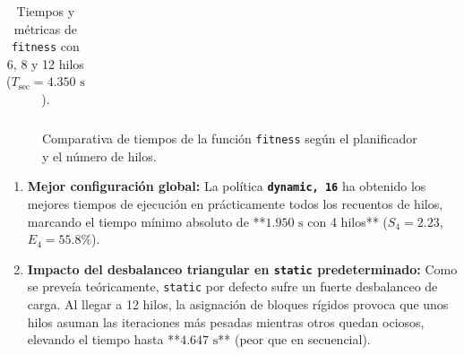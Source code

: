 \documentclass[12pt]{article}
\begin{document}
\begin{enumerate}
\begin{table}[htbp]
\begin{tabular}{llrrr}
    \end{tabular}
    \caption{Tiempos y métricas de \texttt{fitness} con 6, 8 y 12 hilos ($T_{\text{sec}} = 4.350\text{ s}$).}
    \label{tab:scheduling_fitness_b}
\end{table}
\begin{figure}[htbp]
    \centering
    \caption{Comparativa de tiempos de la función \texttt{fitness} según el planificador y el número de hilos.}
    \label{fig:tiempos_fitness}
\end{figure}

\begin{enumerate}
    \item \textbf{Mejor configuración global:} 
    La política \textbf{\texttt{dynamic, 16}} ha obtenido los mejores tiempos de ejecución en prácticamente todos los recuentos de hilos, marcando el tiempo mínimo absoluto de **$1.950\text{ s}$ con 4 hilos** ($S_4 = 2.23$, $E_4 = 55.8\%$).
    
    \item \textbf{Impacto del desbalanceo triangular en \texttt{static} predeterminado:}
    Como se preveía teóricamente, \texttt{static} por defecto sufre un fuerte desbalanceo de carga. Al llegar a 12 hilos, la asignación de bloques rígidos provoca que unos hilos asuman las iteraciones más pesadas mientras otros quedan ociosos, elevando el tiempo hasta **$4.647\text{ s}$** (peor que en secuencial).
    

\end{enumerate}
\end{enumerate}
\end{document}

